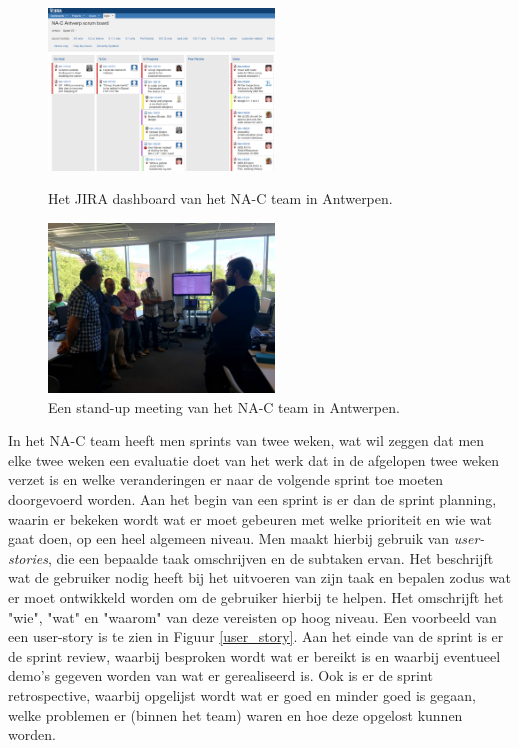 \documentclass[10pt,a4paper]{article}
\begin{document}
\begin{figure}
\centering
\begin{minipage}{0.45\textwidth}
\centering
\includegraphics[width=60mm]{CaptureJira.png}
\caption{Het JIRA dashboard van het NA-C team in Antwerpen.}
\label{jira}
\end{minipage}\hfill
\begin{minipage}{0.45\textwidth}
\centering
\includegraphics[width=60mm]{standupmeeting.jpg}
\caption{Een stand-up meeting van het NA-C team in Antwerpen.}
\label{standup}
\end{minipage}
\end{figure}


In het NA-C team heeft men sprints van twee weken, wat wil zeggen dat men elke twee weken een evaluatie doet van het werk dat in de afgelopen twee weken verzet is en welke veranderingen er naar de volgende sprint toe moeten doorgevoerd worden. Aan het begin van een sprint is er dan de sprint planning, waarin er bekeken wordt wat er moet gebeuren met welke prioriteit en wie wat gaat doen, op een heel algemeen niveau. Men maakt hierbij gebruik van \textit{user-stories}, die een bepaalde taak omschrijven en de subtaken ervan. Het beschrijft wat de gebruiker nodig heeft bij het uitvoeren van zijn taak en bepalen zodus wat er moet ontwikkeld worden om de gebruiker hierbij te helpen. Het omschrijft het "wie", "wat" en "waarom" van deze vereisten op hoog niveau. Een voorbeeld van een user-story is te zien in Figuur \ref{user_story}. Aan het einde van de sprint is er de sprint review, waarbij besproken wordt wat er bereikt is en waarbij eventueel demo's gegeven worden van wat er gerealiseerd is. Ook is er de sprint retrospective, waarbij opgelijst wordt wat er goed en minder goed is gegaan, welke problemen er (binnen het team) waren en hoe deze opgelost kunnen worden.
\end{document}
